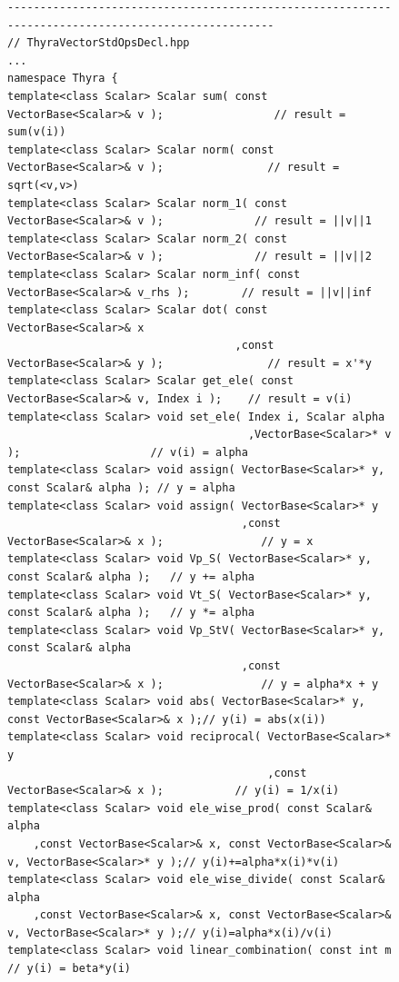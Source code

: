 \documentclass[pdf,ps2pdf,11pt]{SANDreport}
\begin{document}
{\bsinglespace
\begin{figure}[p]
\begin{minipage}{\textwidth}
{\scriptsize\begin{verbatim}
----------------------------------------------------------------------------------------------------
// ThyraVectorStdOpsDecl.hpp
...
namespace Thyra {
template<class Scalar> Scalar sum( const VectorBase<Scalar>& v );                 // result = sum(v(i))
template<class Scalar> Scalar norm( const VectorBase<Scalar>& v );                // result = sqrt(<v,v>)
template<class Scalar> Scalar norm_1( const VectorBase<Scalar>& v );              // result = ||v||1
template<class Scalar> Scalar norm_2( const VectorBase<Scalar>& v );              // result = ||v||2
template<class Scalar> Scalar norm_inf( const VectorBase<Scalar>& v_rhs );        // result = ||v||inf
template<class Scalar> Scalar dot( const VectorBase<Scalar>& x
                                   ,const VectorBase<Scalar>& y );                // result = x'*y
template<class Scalar> Scalar get_ele( const VectorBase<Scalar>& v, Index i );    // result = v(i)
template<class Scalar> void set_ele( Index i, Scalar alpha
                                     ,VectorBase<Scalar>* v );                    // v(i) = alpha
template<class Scalar> void assign( VectorBase<Scalar>* y, const Scalar& alpha ); // y = alpha
template<class Scalar> void assign( VectorBase<Scalar>* y
                                    ,const VectorBase<Scalar>& x );               // y = x
template<class Scalar> void Vp_S( VectorBase<Scalar>* y, const Scalar& alpha );   // y += alpha
template<class Scalar> void Vt_S( VectorBase<Scalar>* y, const Scalar& alpha );   // y *= alpha
template<class Scalar> void Vp_StV( VectorBase<Scalar>* y, const Scalar& alpha
                                    ,const VectorBase<Scalar>& x );               // y = alpha*x + y
template<class Scalar> void abs( VectorBase<Scalar>* y, const VectorBase<Scalar>& x );// y(i) = abs(x(i))
template<class Scalar> void reciprocal( VectorBase<Scalar>* y
                                        ,const VectorBase<Scalar>& x );           // y(i) = 1/x(i)
template<class Scalar> void ele_wise_prod( const Scalar& alpha
    ,const VectorBase<Scalar>& x, const VectorBase<Scalar>& v, VectorBase<Scalar>* y );// y(i)+=alpha*x(i)*v(i)
template<class Scalar> void ele_wise_divide( const Scalar& alpha
    ,const VectorBase<Scalar>& x, const VectorBase<Scalar>& v, VectorBase<Scalar>* y );// y(i)=alpha*x(i)/v(i)
template<class Scalar> void linear_combination( const int m                       // y(i) = beta*y(i)

\end{verbatim}}
\end{minipage}
\end{figure}}
\end{document}
